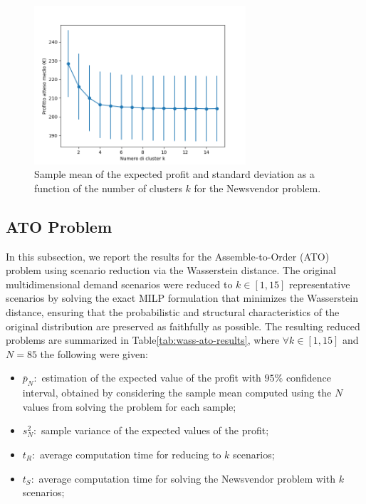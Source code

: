 \documentclass[a4paper,12pt]{article}
\begin{document}
	\begin{figure}[H]
		\centering
		\includegraphics[width=0.7\textwidth]{../immagini/rendimentoWass_nv.png}
		\caption{Sample mean of the expected profit and standard deviation as a function of the number of clusters $k$ for the Newsvendor problem.}
		\label{fig:rendimentoWass-nv}
	\end{figure}	
	
	\subsection{ATO Problem}
	
	In this subsection, we report the results for the Assemble-to-Order (ATO) problem using scenario reduction via the Wasserstein distance. The original multidimensional demand scenarios were reduced to $k \in [1,15]$ representative scenarios by solving the exact MILP formulation that minimizes the Wasserstein distance, ensuring that the probabilistic and structural characteristics of the original distribution are preserved as faithfully as possible. The resulting reduced problems are summarized in Table\ref{tab:wass-ato-results}, where $\forall k \in [1,15]$  and $N = 85 $ the following were given:
	\begin{itemize}
		\item $\bar{p}_{N}:$ estimation of the expected value of the profit with $95\%$ confidence interval, obtained by considering the sample mean computed using the $N$ values from solving the problem for each sample;
		\item $s^{2}_{N}:$ sample variance of the expected values of the profit;
		\item $t_{R}:$ average computation time for reducing to $k$ scenarios;
		\item $t_{S}:$ average computation time for solving the Newsvendor problem with $k$ scenarios;
	\end{itemize}~
	
\end{document}

